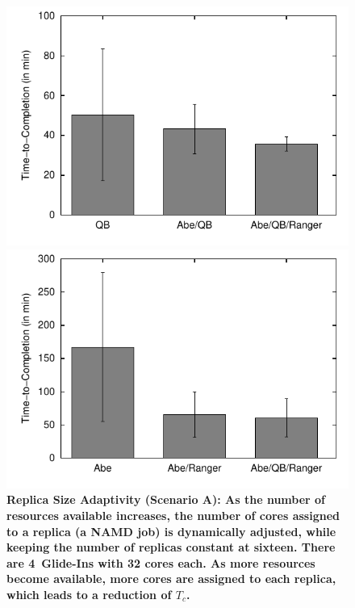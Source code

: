 \documentclass{rspublic}
\begin{document}
\begin{figure}[h]
  \begin{minipage}[t]{.48\textwidth}
    \begin{center}  
      \includegraphics[width=\textwidth]{performance/perf_distributed_size_replica.pdf}
      \caption{\footnotesize \bf Replica Size Adaptivity (Scenario A):
        As the number of resources available increases, the number of
        cores assigned to a replica (a NAMD job) is dynamically
        adjusted, while keeping the number of replicas constant at
        sixteen.  There are 4~Glide-Ins with 32 cores each.  
        As more resources become available, more cores are
        assigned to each replica, which leads to a reduction
        of $T_{c}$.  }
      \label{fig:performance_perf_distributed_A}
    \end{center}
  \end{minipage}
  \hfill
  \begin{minipage}[t]{.485\textwidth}
    \begin{center}  
      \includegraphics[width=\textwidth]{performance/perf_distributed_number_replica.pdf}

\end{center}
\end{minipage}
\end{figure}
\end{document}
